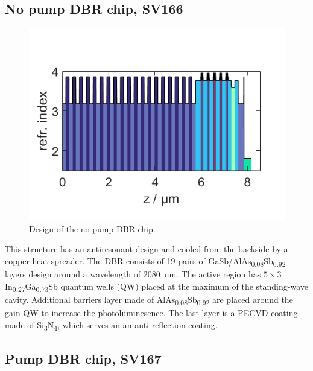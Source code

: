 \subsection*{No pump DBR chip, SV166}

\begin{figure}
    \vspace{-\baselineskip}
    \centering
    \includegraphics[width=.98\textwidth]{images/1SV166.lay.png}
    \caption{Design of the no pump DBR chip.}
    \label{fig:sv166}
\end{figure}

This structure has an antiresonant design and cooled from the backside by a copper heat spreader. The DBR consists of 19-pairs of GaSb/AlAs\textsubscript{0.08}Sb\textsubscript{0.92} layers design around a wavelength of \qty{2080}{nm}. The active region has $5\times3$ In\textsubscript{0.27}Ga\textsubscript{0.73}Sb quantum wells (QW) placed at the maximum of the standing-wave cavity. Additional barriers layer made of AlAs\textsubscript{0.08}Sb\textsubscript{0.92} are placed around the gain QW to increase the photoluminesence. The last layer is a PECVD coating made of Si\textsubscript{3}N\textsubscript{4}, which serves an an anti-reflection coating.


\subsection*{Pump DBR chip, SV167}

